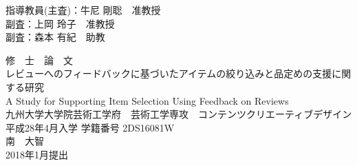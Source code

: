 \begin{titlepage}
\begin{flushright}
{\large
指導教員(主査)：牛尼 剛聡　准教授 \\ %
副査：上岡 玲子　准教授             \\ %
副査：森本 有紀　助教
}
\end{flushright}
\begin{center}
\vspace*{120truept}
{\huge 修　士　論　文}\\ 
\vspace{30truept}
{\Large レビューへのフィードバックに基づいたアイテムの絞り込みと品定めの支援に関する研究}\\ %
\vspace{10truept}
{\large A Study for Supporting Item Selection Using Feedback on Reviews}\\ %
\vspace{140truept}
{\Large 九州大学大学院芸術工学府　芸術工学専攻　コンテンツクリエーティブデザイン}\\ %
{\Large 平成28年4月入学 学籍番号 2DS16081W}\\ %
\vspace{10truept}
{\Large 南　大智}\\ %
\vspace{50truept}
{\Large 2018年1月提出}\\ %
\end{center}
\end{titlepage}